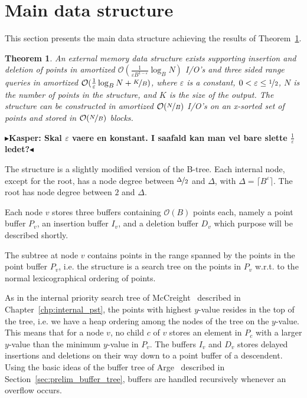 \documentclass[twoside,11pt,openright]{report}
\def \epsilon {\varepsilon}
\newtheorem{theorem}{Theorem}
\newcommand{\todo}[1]{{\color[rgb]{.5,0,0}\textbf{$\blacktriangleright$#1$\blacktriangleleft$}}}
\begin{document}
\section{Main data structure}
\label{sec:main_data_structure}
This section presents the main data structure achieving the results of Theorem~\ref{thm:main_structure}.
\begin{theorem}
\label{thm:main_structure}
An external memory data structure exists supporting insertion and deletion of points in amortized $\mathcal{O}(\frac{1}{\epsilon B^{1-\epsilon}} \log_B N)$ I/O's and three sided range queries in amortized $\mathcal{O}(\frac{1}{\epsilon} \log_B N + \nicefrac{K}{B})$, where $\epsilon$ is a constant, $0 < \epsilon \leq \nicefrac{1}{2}$, $N$ is the number of points in the structure, and $K$ is the size of the output. The structure can be constructed in amortized $\mathcal{O}(\nicefrac{N}{B})$ I/O's on an x-sorted set of points and stored in $\mathcal{O}(\nicefrac{N}{B})$ blocks.
\end{theorem}
\todo{Kasper: Skal $\epsilon$ vaere en konstant. I saafald kan man vel bare slette $\frac{1}{\epsilon}$ ledet?}

The structure is a slightly modified version of the B-tree. Each internal node, except for the root, has a node degree between $\nicefrac{\Delta}{2}$ and $\Delta$, with $\Delta = \lceil B^\epsilon \rceil$. The root has node degree between $2$ and $\Delta$.

Each node $v$ stores three buffers containing $\mathcal{O}(B)$ points each, namely a point buffer $P_v$, an insertion buffer $I_v$, and a deletion buffer $D_v$ which purpose will be described shortly.

The subtree at node $v$ contains points in the range spanned by the points in the point buffer $P_v$, i.e. the structure is a search tree on the points in $P_v$ w.r.t. to the normal lexicographical ordering of points.

As in the internal priority search tree of McCreight~\cite{DBLP:journals/siamcomp/McCreight85} described in Chapter~\ref{chp:internal_pst}, the points with highest $y$-value resides in the top of the tree, i.e. we have a heap ordering among the nodes of the tree on the $y$-value. This means that for a node $v$, no child $c$ of $v$ stores an element in $P_c$ with a larger $y$-value than the minimum $y$-value in $P_v$.
The buffers $I_v$ and $D_v$ stores delayed insertions and deletions on their way down to a point buffer of a descendent. Using the basic ideas of the buffer tree of Arge~\cite{Arge:1995:BTN:645930.672850} described in Section~\ref{sec:prelim_buffer_tree}, buffers are handled recursively whenever an overflow occurs.
\end{document}
